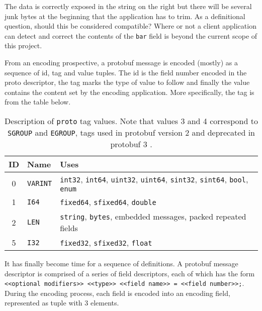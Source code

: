 \documentclass[11pt]{article}
\theoremstyle{definition}
\theoremstyle{plain}
\begin{document}
The data is correctly exposed in the string on the right but there will be
several junk bytes at the beginning that the application has to trim. As a
definitional question, should this be considered compatible? Where or not a
client application can detect and correct the contents of the \texttt{bar} field
is beyond the current scope of this project.

From an encoding prospective, a protobuf message is encoded (mostly) as a
sequence of id, tag and value tuples. The id is the field number encoded in the
proto descriptor, the tag marks the type of value to follow and finally the
value contains the content set by the encoding application. More specifically,
the tag is from the table below.

\begin{table}[H]
	\centering
	\begin{tabular}{cll}
		\toprule
		ID & Name            & Uses                                                 \\
		\midrule
		0  & \texttt{VARINT} & \texttt{int32}, \texttt{int64}, \texttt{uint32},
		\texttt{uint64}, \texttt{sint32}, \texttt{sint64},
		\texttt{bool}, \texttt{enum}                                                \\
		1  & \texttt{I64}    & \texttt{fixed64}, \texttt{sfixed64}, \texttt{double} \\
		2  & \texttt{LEN}    & \texttt{string}, \texttt{bytes}, embedded messages,
		packed repeated fields                                                      \\
		5  & \texttt{I32}    & \texttt{fixed32}, \texttt{sfixed32},
		\texttt{float}                                                              \\
		\bottomrule
	\end{tabular}

	\vspace{4mm}
	\caption[]{Description of \texttt{proto} tag values. Note that values 3 and
		4 correspond to \texttt{SGROUP} and \texttt{EGROUP}, tags used in protobuf
		version 2 and deprecated in protobuf 3 \autocite{Encoding}.}
    \label{tab:tags}
\end{table}

It has finally become time for a sequence of definitions. A protobuf message
descriptor is comprised of a series of field descriptors, each of which has the
form \texttt{<<optional modifiers>> <<type>> <<field name>> = <<field
	number>>;}. During the encoding process, each field is encoded into an
encoding field, represented as tuple with 3 elements.
\end{document}

